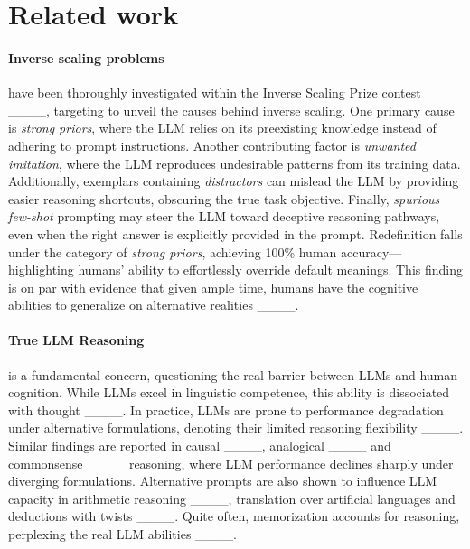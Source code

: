 \section{Related work}
\paragraph{Inverse scaling problems} have been thoroughly investigated within the Inverse Scaling Prize contest ____, targeting to unveil the causes behind inverse scaling. One primary cause is \textit{strong priors}, where the LLM relies on its preexisting knowledge instead of adhering to prompt instructions. Another contributing factor is \textit{unwanted imitation}, where the LLM reproduces undesirable patterns from its training data. Additionally, exemplars containing \textit{distractors} can mislead the LLM by providing easier reasoning shortcuts, obscuring the true task objective. Finally, \textit{spurious few-shot} prompting may steer the LLM toward deceptive reasoning pathways, even when the right answer is explicitly provided in the prompt. Redefinition falls under the category of \textit{strong priors}, achieving 100\% human accuracy—highlighting humans' ability to effortlessly override default meanings. This finding is on par with evidence that given ample time, humans have the cognitive abilities to generalize on alternative realities ____.
\paragraph{True LLM Reasoning} is a fundamental concern, questioning the real barrier between LLMs and human cognition.  While LLMs excel in linguistic competence, this ability is dissociated with thought ____.
In practice, LLMs are prone to performance degradation under alternative formulations, denoting their limited reasoning flexibility ____. Similar findings are reported in causal  ____, analogical ____ and commonsense ____ reasoning, where LLM performance declines sharply under diverging formulations. Alternative prompts are also shown to influence LLM capacity in arithmetic reasoning ____, translation over artificial languages and deductions with twists ____. Quite often, memorization accounts for reasoning, perplexing the real LLM abilities ____.